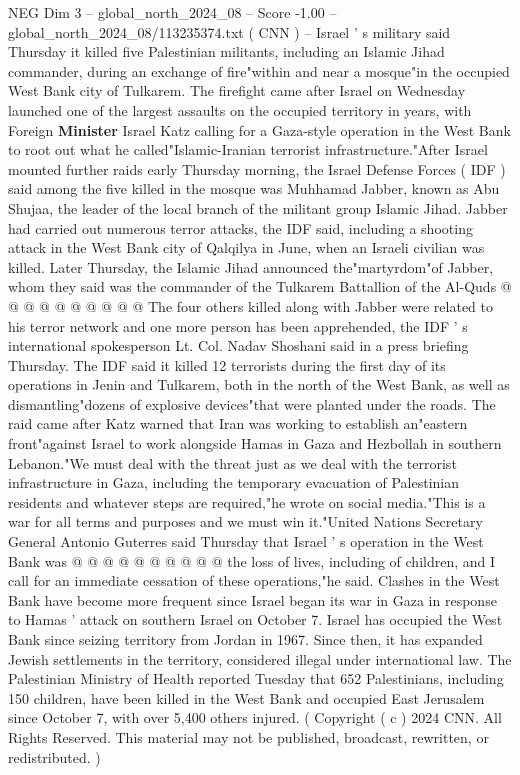 \begin{textsample}{NEG Dim 3 – global\_north\_2024\_08 – Score -1.00 – global\_north\_2024\_08/113235374.txt}  \label{ex:f3_neg_325}
( CNN ) -- Israel ' s military said Thursday it killed five Palestinian militants, including an Islamic Jihad commander, during an exchange of fire"within and near a mosque"in the occupied West Bank city of Tulkarem.
The firefight came after Israel on Wednesday launched one of the largest assaults on the occupied territory in years, with Foreign \textbf{Minister} Israel Katz calling for a Gaza-style operation in the West Bank to root out what he called"Islamic-Iranian terrorist infrastructure."After Israel mounted further raids early Thursday morning, the Israel Defense Forces ( IDF ) said among the five killed in the mosque was Muhhamad Jabber, known as Abu Shujaa, the leader of the local branch of the militant group Islamic Jihad.
Jabber had carried out numerous terror attacks, the IDF said, including a shooting attack in the West Bank city of Qalqilya in June, when an Israeli civilian was killed.
Later Thursday, the Islamic Jihad announced the"martyrdom"of Jabber, whom they said was the commander of the Tulkarem Battallion of the Al-Quds @ @ @ @ @ @ @ @ @ @ The four others killed along with Jabber were related to his terror network and one more person has been apprehended, the IDF ' s international spokesperson Lt.
Col.
Nadav Shoshani said in a press briefing Thursday.
The IDF said it killed 12 terrorists during the first day of its operations in Jenin and Tulkarem, both in the north of the West Bank, as well as dismantling"dozens of explosive devices"that were planted under the roads.
The raid came after Katz warned that Iran was working to establish an"eastern front"against Israel to work alongside Hamas in Gaza and Hezbollah in southern Lebanon."We must deal with the threat just as we deal with the terrorist infrastructure in Gaza, including the temporary evacuation of Palestinian residents and whatever steps are required,"he wrote on social media."This is a war for all terms and purposes and we must win it."United Nations Secretary General Antonio Guterres said Thursday that Israel ' s operation in the West Bank was @ @ @ @ @ @ @ @ @ @ the loss of lives, including of children, and I call for an immediate cessation of these operations,"he said.
Clashes in the West Bank have become more frequent since Israel began its war in Gaza in response to Hamas ' attack on southern Israel on October 7.
Israel has occupied the West Bank since seizing territory from Jordan in 1967.
Since then, it has expanded Jewish settlements in the territory, considered illegal under international law.
The Palestinian Ministry of Health reported Tuesday that 652 Palestinians, including 150 children, have been killed in the West Bank and occupied East Jerusalem since October 7, with over 5,400 others injured. ( Copyright ( c ) 2024 CNN.
All Rights Reserved.
This material may not be published, broadcast, rewritten, or redistributed. )

\end{textsample}
